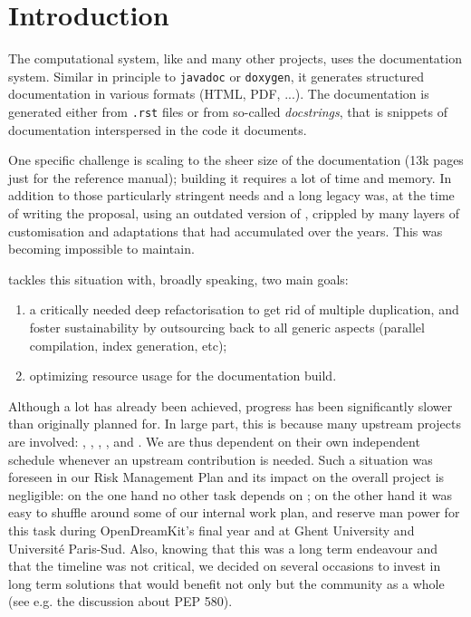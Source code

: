 \documentclass{deliverablereport}
\author{Jeroen Demeyer}
\begin{document}
\maketitle
\tableofcontents


\section{Introduction}

The \Sage computational system, like \Python and many other \Python
projects, uses the \Sphinx documentation system. Similar in principle
to \lstinline{javadoc} or \lstinline{doxygen}, it generates structured
documentation in various formats (HTML, PDF, ...).
The documentation is generated either from \texttt{.rst} files
or from so-called \emph{docstrings}, that is snippets of documentation
interspersed in the code it documents.

One specific challenge is scaling to the sheer size of the \Sage
documentation (13k pages just for the reference manual); building it
requires a lot of time and memory. In addition to those particularly
stringent needs and a long legacy \Sage was, at the time of writing
the proposal, using an outdated version of \Sphinx, crippled by many
layers of customisation and adaptations that had accumulated over the
years. This was becoming impossible to maintain.

 tackles this situation with, broadly
speaking, two main goals:
\begin{enumerate}
\item a critically needed deep refactorisation to get rid of multiple
  duplication, and foster sustainability by outsourcing back to
  \Sphinx all generic aspects (parallel compilation, index generation,
  etc);
\item optimizing resource usage for the documentation build.
\end{enumerate}

Although a lot has already been achieved, progress has been
significantly slower than originally planned for. In large part, this
is because many upstream projects are involved: \Sphinx, \Docutils,
\Pygments, \Cython, and \Python. We are thus dependent on their own
independent schedule whenever an upstream contribution is needed. Such
a situation was foreseen in our Risk Management Plan and its impact on
the overall project is negligible: on the one hand no other task
depends on ; on the other hand it was easy to
shuffle around some of our internal work plan, and reserve man power
for this task during OpenDreamKit's final year and at Ghent University
and Université Paris-Sud. Also, knowing that this was a long term
endeavour and that the timeline was not critical, we decided on
several occasions to invest in long term solutions that would benefit
not only \Sage but the community as a whole (see e.g. the discussion
about PEP 580).
\end{document}
